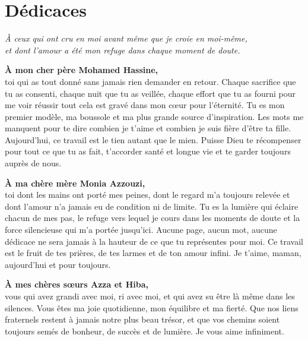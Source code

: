 \chapter*{Dédicaces}
\thispagestyle{plain}

\begin{center}
\textit{\textcolor{or}{À ceux qui ont cru en moi avant même que je croie en moi-même,\\
et dont l'amour a été mon refuge dans chaque moment de doute.}}
\end{center}

\vspace{1cm}

\noindent\textbf{À mon cher père Mohamed Hassine,}\\
toi qui as tout donné sans jamais rien demander en retour. Chaque sacrifice que tu as consenti, chaque nuit que tu as veillée, chaque effort que tu as fourni pour me voir réussir tout cela est gravé dans mon cœur pour l'éternité. Tu es mon premier modèle, ma boussole et ma plus grande source d'inspiration. Les mots me manquent pour te dire combien je t'aime et combien je suis fière d'être ta fille. Aujourd'hui, ce travail est le tien autant que le mien. Puisse Dieu te récompenser pour tout ce que tu as fait, t'accorder santé et longue vie et te garder toujours auprès de nous.

\vspace{0.8cm}

\noindent\textbf{À ma chère mère Monia Azzouzi,}\\
toi dont les mains ont porté mes peines, dont le regard m'a toujours relevée et dont l'amour n'a jamais eu de condition ni de limite. Tu es la lumière qui éclaire chacun de mes pas, le refuge vers lequel je cours dans les moments de doute et la force silencieuse qui m'a portée jusqu'ici. Aucune page, aucun mot, aucune dédicace ne sera jamais à la hauteur de ce que tu représentes pour moi. Ce travail est le fruit de tes prières, de tes larmes et de ton amour infini. Je t'aime, maman, aujourd'hui et pour toujours.

\vspace{0.8cm}

\noindent\textbf{À mes chères sœurs Azza et Hiba,}\\
vous qui avez grandi avec moi, ri avec moi, et qui avez su être là même dans les silences. Vous êtes ma joie quotidienne, mon équilibre et ma fierté. Que nos liens fraternels restent à jamais notre plus beau trésor, et que vos chemins soient toujours semés de bonheur, de succès et de lumière. Je vous aime infiniment.

